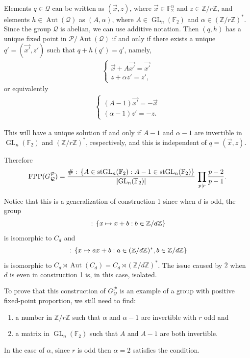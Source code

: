 \documentclass{amsart}
\def\set#1{{\def\st{\;:\;}\left\{#1\right\}}}
\def\abs#1{\left\vert{#1}\right\vert}
\def\ZZ{\mathbb Z}
\def\FF{\mathbb F}
\DeclareMathOperator{\Aut}{Aut}
\DeclareMathOperator{\FPP}{FPP}
\DeclareMathOperator{\st}{st}
\DeclareMathOperator{\GL}{GL}
\begin{document}
Elements $q \in \mathcal{Q}$ can be written as $(\vec{x},z)$, where $\vec{x} \in \FF_2^n$ and $z \in \ZZ/r\ZZ$, and elements $h \in \Aut(\mathcal{Q})$ as $(A,\alpha)$, where $A \in \GL_n(\FF_2)$ and $\alpha \in (\ZZ/r\ZZ)^*$. Since the group $\mathcal{Q}$ is abelian, we can use additive notation. Then $(q,h)$ has a unique fixed point in $\mathcal{P}/\Aut(\mathcal{Q})$ if and only if there exists a unique $q' = (\vec{x'}, z')$ such that $q + h(q') = q'$, namely, 
\begin{align*}
\left \{ \begin{matrix} \vec{x} + A \vec{x'} = \vec{x'}  \\ 
z + \alpha z' = z',  
\end{matrix}\right.
\end{align*}
or equivalently
\begin{align*}
\left \{ \begin{matrix} (A-1) \vec{x'} = -\vec{x}  \\ 
(\alpha-1) z' = -z.  
\end{matrix}\right.
\end{align*}

This will have a unique solution if and only if $A-1$ and $\alpha-1$ are invertible in $\GL_n(\FF_2)$ and $(\ZZ/r\ZZ)^*$, respectively, and this is independent of $q = (\vec{x}, z)$.

Therefore $$\FPP(G_\mathcal{Q}^\mathcal{P}) = \frac{\# \set{A \in \GL_n(\FF_2): A-1 \in \GL_n(\FF_2)}}{\abs{\GL_n(\FF_2)}} \, \prod_{p \mid r} \frac{p-2}{p-1}.$$

Notice that this is a generalization of construction 1 since when $d$ is odd, the group $$\set{x \mapsto x+b: b \in \ZZ/d\ZZ}$$ is isomorphic to $C_d$ and $$\set{x \mapsto ax+b: a \in (\ZZ/d\ZZ)^*, b \in \ZZ/d\ZZ}$$ is isomorphic to $C_d \rtimes \Aut(C_d) = C_d \rtimes (\ZZ/d\ZZ)^*$. The issue caused by $2$ when $d$ is even in construction 1 is, in this case, isolated. 

To prove that this construction of $G_\mathcal{Q}^\mathcal{P}$ is an example of a group with positive fixed-point proportion, we still need to find: 
\begin{enumerate}
\item a number in $\ZZ/r\ZZ$ such that $\alpha$ and $\alpha -1$ are invertible with $r$ odd and 
\item a matrix in $\GL_n(\FF_2)$ such that $A$ and $A-1$ are both invertible.
\end{enumerate}

In the case of $\alpha$, since $r$ is odd then $\alpha = 2$ satisfies the condition. 
\end{document}
